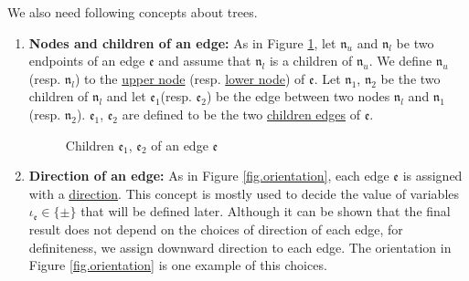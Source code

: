 We also need following concepts about trees.
\begin{defn}\label{def.treemore}
\begin{enumerate}
    \item \textbf{Nodes and children of an edge:} As in Figure \ref{fig.childrenofedge}, let $\mathfrak{n}_{u}$ and $\mathfrak{n}_{l}$ be two endpoints of an edge $\mathfrak{e}$ and assume that $\mathfrak{n}_{l}$ is a children of $\mathfrak{n}_{u}$. We define $\mathfrak{n}_{u}$ (resp. $\mathfrak{n}_{l}$) to the \underline{upper node} (resp. \underline{lower node}) of $\mathfrak{e}$. Let $\mathfrak{n}_1$, $\mathfrak{n}_2$ be the two children of $\mathfrak{n}_{l}$ and let $\mathfrak{e}_1$(resp. $\mathfrak{e}_2$) be the edge between two nodes $\mathfrak{n}_{l}$ and $\mathfrak{n}_1$(resp. $\mathfrak{n}_2$). $\mathfrak{e}_1$, $\mathfrak{e}_2$ are defined to be the two \underline{children edges} of $\mathfrak{e}$. 
    \begin{figure}[H]
    \centering
        \caption{Children $\mathfrak{e}_1$, $\mathfrak{e}_2$ of an edge $\mathfrak{e}$}
        \label{fig.childrenofedge}
    \end{figure}
    \item \textbf{Direction of an edge:} As in Figure \ref{fig.orientation}, each edge $\mathfrak{e}$ is  assigned with a \underline{direction}. This concept is mostly used to decide the value of variables $\iota_{\mathfrak{e}}\in\{\pm\}$ that will be defined later. Although it can be shown that the final result does not depend on the choices of direction of each edge, for definiteness, we assign downward direction to each edge. The orientation in Figure \ref{fig.orientation} is one example of this choices.

\end{enumerate}
\end{defn}
